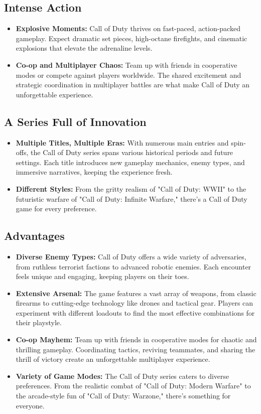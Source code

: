 \subsection{Intense Action}
\begin{itemize}
	\item \textbf{Explosive Moments:} Call of Duty thrives on fast-paced, action-packed gameplay. Expect dramatic set pieces, high-octane firefights, and cinematic explosions that elevate the adrenaline levels.
	\item \textbf{Co-op and Multiplayer Chaos:} Team up with friends in cooperative modes or compete against players worldwide. The shared excitement and strategic coordination in multiplayer battles are what make Call of Duty an unforgettable experience.
\end{itemize}

\subsection{A Series Full of Innovation}
\begin{itemize}
	\item \textbf{Multiple Titles, Multiple Eras:} With numerous main entries and spin-offs, the Call of Duty series spans various historical periods and future settings. Each title introduces new gameplay mechanics, enemy types, and immersive narratives, keeping the experience fresh.
	\item \textbf{Different Styles:} From the gritty realism of "Call of Duty: WWII" to the futuristic warfare of "Call of Duty: Infinite Warfare," there’s a Call of Duty game for every preference.
\end{itemize}

\subsection{Advantages}
\begin{itemize}
	\item \textbf{Diverse Enemy Types:} Call of Duty offers a wide variety of adversaries, from ruthless terrorist factions to advanced robotic enemies. Each encounter feels unique and engaging, keeping players on their toes.
	\item \textbf{Extensive Arsenal:} The game features a vast array of weapons, from classic firearms to cutting-edge technology like drones and tactical gear. Players can experiment with different loadouts to find the most effective combinations for their playstyle.
	\item \textbf{Co-op Mayhem:} Team up with friends in cooperative modes for chaotic and thrilling gameplay. Coordinating tactics, reviving teammates, and sharing the thrill of victory create an unforgettable multiplayer experience.
	\item \textbf{Variety of Game Modes:} The Call of Duty series caters to diverse preferences. From the realistic combat of "Call of Duty: Modern Warfare" to the arcade-style fun of "Call of Duty: Warzone," there’s something for everyone.
\end{itemize}

